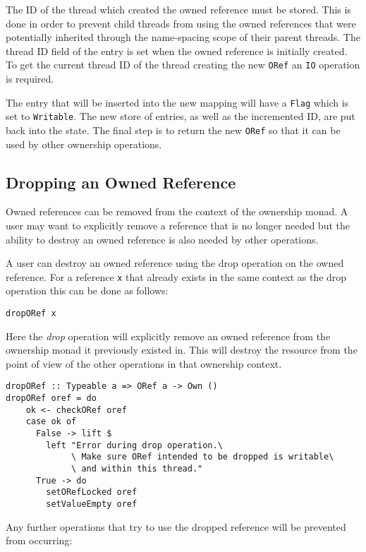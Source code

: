 \documentclass[onehalf,11pt]{beavtex}
\begin{document}
The ID of the thread which created the owned reference must be stored.
This is done in order to prevent child threads from using the owned
references that were potentially inherited through the name-spacing scope of
their parent threads.  The thread ID field of the entry is set when the owned
reference is initially created.
To get the current thread ID of the thread creating the new \texttt{ORef}
an \texttt{IO} operation is required.

The entry that will be inserted into the new mapping will have a \texttt{Flag}
which is set to \texttt{Writable}.
The new store of entries, as well as the incremented ID, are put back into the
state.
The final step is to return the new \texttt{ORef} so that it can be used by other
ownership operations.

\subsection{Dropping an Owned Reference}

Owned references can be removed from the context of the ownership monad.
A user may want to explicitly remove a reference that is no longer needed but
the ability to destroy an owned reference is also needed by other operations.

A user can destroy an owned reference using the drop operation on the owned
reference. For a reference \texttt{x} that already exists in the same context
as the drop operation this can be done as follows:

\begin{verbatim}
dropORef x
\end{verbatim}

Here the \textit{drop} operation will explicitly remove an owned reference from
the ownership monad it previously existed in.
This will destroy the resource from the point of view of the other operations
in that ownership context.

\begin{verbatim}
dropORef :: Typeable a => ORef a -> Own ()
dropORef oref = do
    ok <- checkORef oref
    case ok of
      False -> lift $
        left "Error during drop operation.\
             \ Make sure ORef intended to be dropped is writable\
             \ and within this thread."
      True -> do
        setORefLocked oref
        setValueEmpty oref
\end{verbatim}

Any further operations that try to use the dropped reference will be prevented
from occurring:
\end{document}
